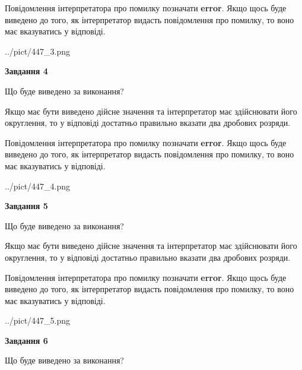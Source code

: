 \documentclass[12pt, ukrainian]{article}
\begin{document}
{\begin {Large}
Повідомлення інтерпретатора про помилку позначати \textbf{error}.
Якщо щось буде виведено до того, як інтерпретатор видасть повідомлення про помилку, 
то воно має вказуватись у відповіді. \par

\begin{center}
	{../pict/447_3.png}
\end{center}
\newpage

{\begin {center}\textbf{Завдання 4}\end {center}}\par
Що буде виведено за виконання? \par

Якщо має бути виведено дійсне значення та інтерпретатор має здійснювати його округлення, 
то у відповіді достатньо правильно вказати два дробових розряди.

Повідомлення інтерпретатора про помилку позначати \textbf{error}.
Якщо щось буде виведено до того, як інтерпретатор видасть повідомлення про помилку, 
то воно має вказуватись у відповіді. \par

\begin{center}
	{../pict/447_4.png}
\end{center}
\newpage

{\begin {center}\textbf{Завдання 5}\end {center}}\par
Що буде виведено за виконання? \par

Якщо має бути виведено дійсне значення та інтерпретатор має здійснювати його округлення, 
то у відповіді достатньо правильно вказати два дробових розряди.

Повідомлення інтерпретатора про помилку позначати \textbf{error}.
Якщо щось буде виведено до того, як інтерпретатор видасть повідомлення про помилку, 
то воно має вказуватись у відповіді. \par

\begin{center}
	{../pict/447_5.png}
\end{center}
\newpage

{\begin {center}\textbf{Завдання 6}\end {center}}\par
Що буде виведено за виконання? \par


\end{Large}}
\end{document}
